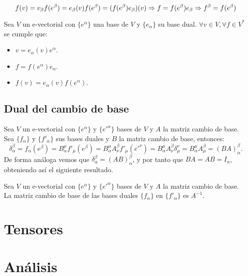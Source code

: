 \begin{equation*}
  f(v)=v_\beta f(e^\beta)=e_\beta(v)f(e^\beta)=(f(e^\beta) e_\beta)(v)\Rightarrow f=f(e^\beta) e_\beta\Rightarrow f^\beta=f(e^\beta)
\end{equation*}

\begin{proposition}
  \label{res:coordenadas_duales}
  Sea $V$ un e-vectorial con $\{e^\alpha\}$ una base de $V$ y $\{e_\alpha\}$ su base dual.
  $\forall v\in V, \forall f\in V^*$ se cumple que:
  \begin{itemize}
    \item $v=e_\alpha(v)e^\alpha$.
    \item $f=f(e^\alpha)e_\alpha$.
    \item $f(v)=e_\alpha(v)f(e^\alpha)$.
  \end{itemize}
\end{proposition}


\section{Dual del cambio de base}\label{sec:dual-del-cambio-de-base}
Sea $V$ un e-vectorial con $\{e^\alpha\}$ y $\{e'^\alpha\}$ bases de $V$ y $A$ la matriz cambio de base.
Sea $\{f_\alpha\}$ y $\{f'_\alpha\}$ sus bases duales y $B$ la matriz cambio de base, entonces:
\[
  \delta_\alpha^\beta=f_\alpha(e^\beta)=B_\alpha^\mu f'_\mu(e^\beta)=B_\alpha^\mu A^\beta_\nu f'_\mu(e'^\nu)=B_\alpha^\mu A^\beta_\nu\delta^\nu_\mu=B_\alpha^\mu A^\beta_\mu=(BA)^\beta_\alpha.
\]
De forma análoga vemos que $\delta^\beta_\alpha=(AB)^\beta_\alpha$, y por tanto que $BA=AB=I_n$, obteniendo así el siguiente resultado.

\begin{proposition}
  \label{res:dual_cambio_base}
  Sea $V$ un e-vectorial con $\{e^\alpha\}$ y $\{e'^\alpha\}$ bases de $V$ y $A$ la matriz cambio de base.
  La matriz cambio de base de las bases duales $\{f_\alpha\}$ en $\{f'_\alpha\}$ es $A^{-1}$.

\end{proposition}


\chapter{Tensores}\label{ch:tensores}


\chapter{An\'alisis}\label{ch:analisis}

